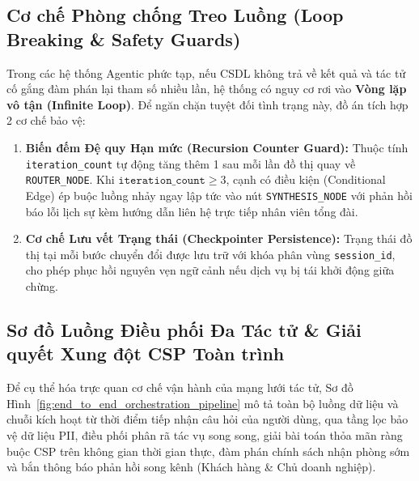 \subsection{Cơ chế Phòng chống Treo Luồng (Loop Breaking \& Safety Guards)}
\label{subsec:safety_guards}

Trong các hệ thống Agentic phức tạp, nếu CSDL không trả về kết quả và tác tử cố gắng đàm phán lại tham số nhiều lần, hệ thống có nguy cơ rơi vào \textbf{Vòng lặp vô tận (Infinite Loop)}. Để ngăn chặn tuyệt đối tình trạng này, đồ án tích hợp 2 cơ chế bảo vệ:
\begin{enumerate}
    \item \textbf{Biến đếm Đệ quy Hạn mức (Recursion Counter Guard):} Thuộc tính \texttt{iteration\_count} tự động tăng thêm 1 sau mỗi lần đồ thị quay về \texttt{ROUTER\_NODE}. Khi $\texttt{iteration\_count} \ge 3$, cạnh có điều kiện (Conditional Edge) ép buộc luồng nhảy ngay lập tức vào nút \texttt{SYNTHESIS\_NODE} với phản hồi báo lỗi lịch sự kèm hướng dẫn liên hệ trực tiếp nhân viên tổng đài.
    \item \textbf{Cơ chế Lưu vết Trạng thái (Checkpointer Persistence):} Trạng thái đồ thị tại mỗi bước chuyển đổi được lưu trữ với khóa phân vùng \texttt{session\_id}, cho phép phục hồi nguyên vẹn ngữ cảnh nếu dịch vụ bị tái khởi động giữa chừng.
\end{enumerate}


\subsection{Sơ đồ Luồng Điều phối Đa Tác tử \& Giải quyết Xung đột CSP Toàn trình}
\label{subsec:e2e_orchestration_pipeline}

Để cụ thể hóa trực quan cơ chế vận hành của mạng lưới tác tử, Sơ đồ Hình~\ref{fig:end_to_end_orchestration_pipeline} mô tả toàn bộ luồng dữ liệu và chuỗi kích hoạt từ thời điểm tiếp nhận câu hỏi của người dùng, qua tầng lọc bảo vệ dữ liệu PII, điều phối phân rã tác vụ song song, giải bài toán thỏa mãn ràng buộc CSP trên không gian thời gian thực, đàm phán chính sách nhận phòng sớm và bắn thông báo phản hồi song kênh (Khách hàng \& Chủ doanh nghiệp).

